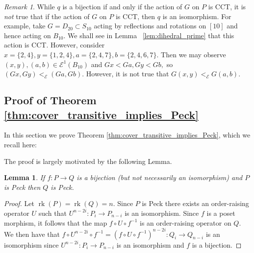 \documentclass[10 pt]{amsart}
\theoremstyle{plain}
\newtheorem{lem}[thm]{Lemma}
\theoremstyle{definition}
\theoremstyle{remark}
\newtheorem{rem}[thm]{Remark}
\numberwithin{equation}{section}
\newcommand\ssec{\subsection}
\newcommand\rk{\operatorname{rk}}
\begin{document}
\begin{rem}
While $q$ is a bijection if and only if the action of $G$ on $P$ is CCT, it is {\it not} true that if the action of $G$ on $P$ is CCT, then $q$ is an isomorphism.  For example, take $G=D_{20} \subset S_{10}$ acting by reflections and rotations on $[10]$ and hence acting on $B_{10}.$ We shall see in Lemma ~\ref{lem:dihedral_prime} that this action is CCT. However, consider $x = \{2,4\},y = \{1,2,4\},a = \{2,4,7\},b = \{2,4,6,7\}.$ Then we may observe $(x , y),(a, b) \in \mathcal E^1(B_{10})$ and $Gx < Ga, Gy < Gb,$ so $(Gx, Gy) <_{\mathcal E} (Ga, Gb).$ However, it is not true that $G(x, y)<_{\mathcal E} G(a,b)$.
\end{rem}




\ssec{Proof of Theorem \ref{thm:cover_transitive_implies_Peck}}\label{ssec:proof_of_cover_transitive_implies_Peck}

In this section we prove Theorem \ref{thm:cover_transitive_implies_Peck}, which we recall here:

\cctpeck*

The proof is largely motivated by the following Lemma.

\begin{lem}\label{lem:bijection_peck_implication}
If $f:P\rightarrow Q$ is a bijection (but not necessarily an isomorphism) and $P$ is Peck then $Q$ is Peck.
\end{lem}
\begin{proof}
Let $\rk(P) = \rk(Q) = n$.  Since $P$ is Peck there exists an order-raising operator $U$ such that $U^{n-2i}\colon P_i\rightarrow P_{n-i}$ is an isomorphism.  Since $f$ is a poset morphism, it follows that the map $f\circ U\circ f^{-1}$ is an order-raising operator on $Q$.  We then have that $f\circ U^{n-2i}\circ f^{-1} = \left(f\circ U\circ f^{-1}\right)^{n-2i}\colon Q_i\rightarrow Q_{n-i}$ is an isomorphism since $U^{n-2i}\colon P_i\rightarrow P_{n-i}$ is an isomorphism and $f$ is a bijection.

\end{proof}
\end{document}
